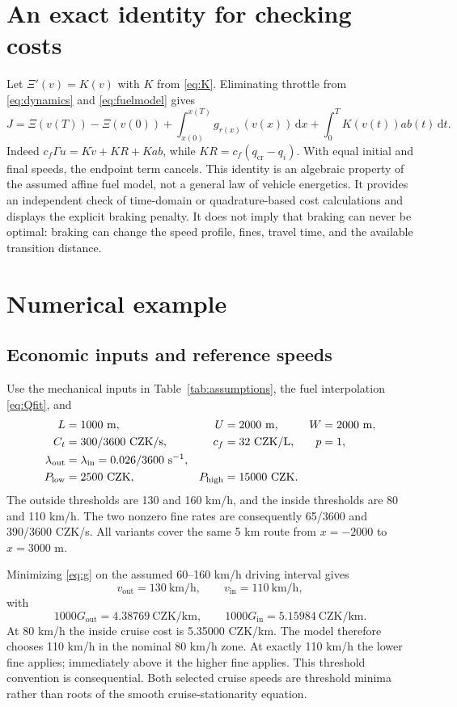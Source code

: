 \documentclass[10pt,a4paper]{article}
\newcommand{\dd}{\,\mathrm{d}}
\newcommand{\out}{\mathrm{out}}
\newcommand{\inn}{\mathrm{in}}
\newcommand{\cruise}{\mathrm{cr}}
\newcommand{\CZK}{\mathrm{CZK}}
\begin{document}
\section{An exact identity for checking costs}
\label{sec:identity}
Let $\Xi'(v)=K(v)$ with $K$ from \eqref{eq:K}. Eliminating throttle from \eqref{eq:dynamics} and \eqref{eq:fuelmodel} gives
\begin{equation}
\boxed{
J=\Xi(v(T))-\Xi(v(0))
 +\int_{x(0)}^{x(T)}g_{r(x)}(v(x))\dd x
 +\int_0^T K(v(t))ab(t)\dd t.}
\label{eq:identity}
\end{equation}
Indeed $c_f\Gamma u=K\dot v+KR+Kab$, while $KR=c_f(q_{\cruise}-q_i)$. With equal initial and final speeds, the endpoint term cancels. This identity is an algebraic property of the assumed affine fuel model, not a general law of vehicle energetics. It provides an independent check of time-domain or quadrature-based cost calculations and displays the explicit braking penalty. It does not imply that braking can never be optimal: braking can change the speed profile, fines, travel time, and the available transition distance.

\section{Numerical example}
\label{sec:numerical}
\subsection{Economic inputs and reference speeds}
Use the mechanical inputs in Table~\ref{tab:assumptions}, the fuel interpolation \eqref{eq:Qfit}, and
\begin{align}
L&=1000\ \mathrm{m},&U&=2000\ \mathrm{m},&W&=2000\ \mathrm{m},\notag\\
C_t&=300/3600\ \CZK/\mathrm{s},&c_f&=32\ \CZK/\mathrm{L},&p&=1,\notag\\
\lambda_{\out}&=\lambda_{\inn}=0.026/3600\ \mathrm{s^{-1}},\notag\\
P_{\mathrm{low}}&=2500\ \CZK,&P_{\mathrm{high}}&=15000\ \CZK.
\end{align}
The outside thresholds are 130 and 160 km/h, and the inside thresholds are 80 and 110 km/h. The two nonzero fine rates are consequently 65/3600 and 390/3600 CZK/s. All variants cover the same 5 km route from $x=-2000$ to $x=3000$ m.

Minimizing \eqref{eq:g} on the assumed 60--160 km/h driving interval gives
\begin{equation}
v_{\out}=130\ \mathrm{km/h},\qquad v_{\inn}=110\ \mathrm{km/h},
\end{equation}
with
\begin{equation}
1000G_{\out}=4.38769\ \CZK/\mathrm{km},\qquad
1000G_{\inn}=5.15984\ \CZK/\mathrm{km}.
\end{equation}
At 80 km/h the inside cruise cost is 5.35000 CZK/km. The model therefore chooses 110 km/h in the nominal 80 km/h zone. At exactly 110 km/h the lower fine applies; immediately above it the higher fine applies. This threshold convention is consequential. Both selected cruise speeds are threshold minima rather than roots of the smooth cruise-stationarity equation.
\end{document}
